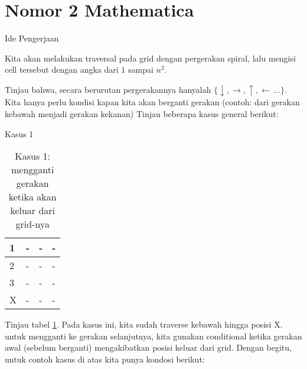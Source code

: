\documentclass{beamer}
\begin{document}

\section{Nomor 2 Mathematica}
\begin{frame}{Ide Pengerjaan}

Kita akan melakukan traversal pada grid dengan pergerakan spiral, 
lalu mengisi cell tersebut dengan angka dari $1$ sampai $n^2$. \pause

Tinjau bahwa, secara berurutan pergerakannya hanyalah $\{\downarrow, \rightarrow, \uparrow, \leftarrow\, \dots\}$. \pause
Kita hanya perlu kondisi kapan kita akan berganti gerakan (contoh: dari gerakan kebawah menjadi gerakan kekanan)
Tinjau beberapa kasus general berikut:
\end{frame}

\begin{frame}[fragile]{Kasus 1}
    \item 
    \begin{table}[!ht]
        \centering
        \caption{Kasus 1: mengganti gerakan ketika akan keluar dari grid-nya}
        \begin{tabular}{|l|l|l|l|}
        \hline
            1 & - & - & - \\ \hline
            2 & - & - & - \\ \hline
            3 & - & - & - \\ \hline
            X & - & - & - \\ \hline
        \end{tabular}
        \label{spiralgrid1}
    \end{table}

    Tinjau tabel \ref{spiralgrid1}. Pada kasus ini, kita sudah traverse kebawah hingga posisi X.
    untuk mengganti ke gerakan selanjutnya, kita gunakan conditional ketika gerakan awal (sebelum berganti) mengakibatkan posisi keluar dari grid.
    Dengan begitu, untuk contoh kasus di atas kita punya kondosi berikut:
   
\end{frame}
\end{document}
